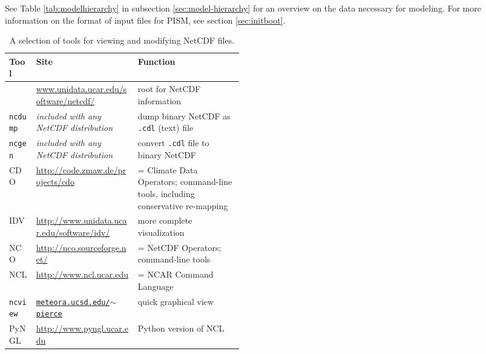 See Table \ref{tab:modelhierarchy} in subsection \ref{sec:model-hierarchy} for an overview on the data necessary for modeling.  For more information on the format of input files for PISM, see section \ref{sec:initboot}.

\newcommand{\netcdftool}[1]{#1\index{NetCDF!tools!#1}}
\begin{table}[ht]
\centering
\small
\begin{tabular}{llp{0.45\linewidth}}
  \toprule
  \textbf{Tool} & \textbf{Site} & \textbf{Function} \\
  \midrule
  & \url{www.unidata.ucar.edu/software/netcdf/} & root for NetCDF information \\
  \midrule
  \netcdftool{\texttt{ncdump}} & \emph{included with any NetCDF distribution} & dump binary NetCDF as \texttt{.cdl} (text) file \\
  \netcdftool{\texttt{ncgen}} & \emph{included with any NetCDF distribution} & convert \texttt{.cdl} file to binary NetCDF \\
  \midrule
  \netcdftool{CDO} & \url{http://code.zmaw.de/projects/cdo} & = Climate Data Operators; command-line tools, including conservative re-mapping \\
  \netcdftool{IDV} & \url{http://www.unidata.ucar.edu/software/idv/} & more complete visualization \\
  \netcdftool{NCO}\index{NCO (NetCDF Operators)} & \url{http://nco.sourceforge.net/} & = NetCDF Operators; command-line tools\\
  \netcdftool{NCL} &  \url{http://www.ncl.ucar.edu} & = NCAR Command Language\\
  \netcdftool{\texttt{ncview}} & \href{http://meteora.ucsd.edu/~pierce/ncview_home_page.html}{\texttt{meteora.ucsd.edu/$\sim$pierce}} & quick graphical view \\
  \netcdftool{PyNGL} &  \url{http://www.pyngl.ucar.edu} & Python version of NCL\\
  \bottomrule
\end{tabular}
\normalsize
\caption{A selection of tools for viewing and modifying NetCDF files.}
\label{tab:NetCDFview}
\end{table}




